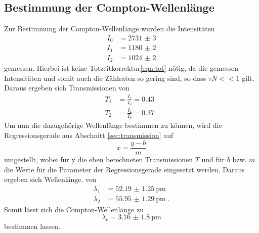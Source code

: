 \subsection{Bestimmung der Compton-Wellenlänge}
Zur Bestimmung der Compton-Wellenlänge wurden die Intensitäten 
\begin{align*}
    I_0 &= \num{2731(3)}\\
    I_1 &= \num{1180(2)}\\
    I_2 &= \num{1024(2)}
\end{align*}
gemessen. 
Hierbei ist keine Totzeitkorrektur\eqref{eqn:tot} nötig, da die gemessen Intensitäten und somit auch die Zählraten so gering sind,
so dass $\tau N << 1$ gilt.
Daraus ergeben sich Transmissionen von 
\begin{align*}
    T_1 &=\frac{I_1}{I_0} = 0.43 \\
    T_2 &=\frac{I_2}{I_0} = 0.37 \; \text{.}
\end{align*}
Um nun die dazugehörige Wellenlänge bestimmen zu können, wird die Regressionsgerade aus Abschnitt \ref{sec:transmission}
auf
\begin{equation*}
    x = \frac{y-b}{m}
\end{equation*}
umgestellt, wobei für y die eben berechneten Transmissionen $T$ und für $b$ bzw. $m$ die Werte für die Parameter der Regressionsgerade eingesetzt werden.
Daraus ergeben sich Wellenlänge. von 
\begin{align*}
    \lambda_1 &= \SI{52.19(125)}{\pico\metre} \\
    \lambda_2 &= \SI{55.95(129)}{\pico\metre} \; \text{.}
\end{align*}
Somit lässt sich die Compton-Wellenlänge zu 
\begin{equation*}
    \lambda_\text{c} = \SI{3.76(180)}{\pico\metre}
\end{equation*}
bestimmen lassen.